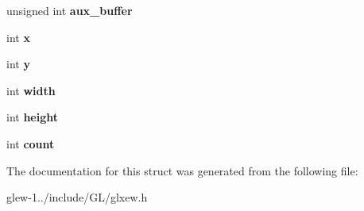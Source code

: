 \begin{DoxyCompactItemize}
\item 
\hypertarget{struct_g_l_x_pbuffer_clobber_event_a13193b6e7e3e52b15f754fe91403b7ec}{unsigned int {\bfseries aux\-\_\-buffer}}\label{struct_g_l_x_pbuffer_clobber_event_a13193b6e7e3e52b15f754fe91403b7ec}

\item 
\hypertarget{struct_g_l_x_pbuffer_clobber_event_a8f0a7162a033c89ee94ce535580dbc32}{int {\bfseries x}}\label{struct_g_l_x_pbuffer_clobber_event_a8f0a7162a033c89ee94ce535580dbc32}

\item 
\hypertarget{struct_g_l_x_pbuffer_clobber_event_a69eb7ac60d36ac3ec4550ac206cfc61f}{int {\bfseries y}}\label{struct_g_l_x_pbuffer_clobber_event_a69eb7ac60d36ac3ec4550ac206cfc61f}

\item 
\hypertarget{struct_g_l_x_pbuffer_clobber_event_aaca375fecb872c73c60cd5d0bfc7c7a5}{int {\bfseries width}}\label{struct_g_l_x_pbuffer_clobber_event_aaca375fecb872c73c60cd5d0bfc7c7a5}

\item 
\hypertarget{struct_g_l_x_pbuffer_clobber_event_aed4e539c896bdad15217bf92c28f8520}{int {\bfseries height}}\label{struct_g_l_x_pbuffer_clobber_event_aed4e539c896bdad15217bf92c28f8520}

\item 
\hypertarget{struct_g_l_x_pbuffer_clobber_event_a61e9f6b31738464dca67f909fcacd298}{int {\bfseries count}}\label{struct_g_l_x_pbuffer_clobber_event_a61e9f6b31738464dca67f909fcacd298}

\end{DoxyCompactItemize}


The documentation for this struct was generated from the following file\-:\begin{DoxyCompactItemize}
\item 
glew-\/1../include/\-G\-L/glxew.\-h\end{DoxyCompactItemize}
